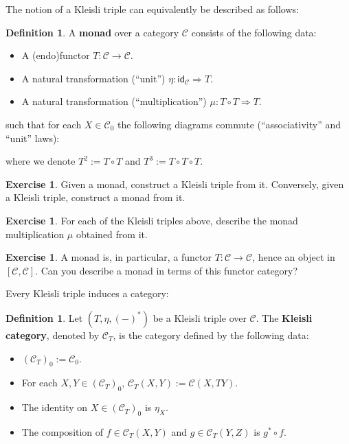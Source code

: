 \documentclass[a4paper,11pt, oneside,titlepage=false]{scrbook}
\theoremstyle{plain}
\theoremstyle{definition}
\newtheorem{dfn}[thm]{Definition}
\newtheorem{exer}[thm]{Exercise}
\newcommand{\cfont}[1]{\ensuremath{\mathsf{#1}}}
\newcommand{\Cat}[1]{\mathcal{#1}}
\newcommand{\CC}{\Cat{C}}
\newcommand{\Ob}[1]{{#1}_0}
\newcommand{\CHom}[3]{{#1}(#2,#3)}
\newcommand{\Id}[1][]{\cfont{id}_{#1}}
\newcommand{\NatTrans}[3]{#1 : #2 \Rightarrow #3}
\newcommand{\co}[2]{\ensuremath{#2 \circ #1}}
\begin{document}
The notion of a Kleisli triple can equivalently be described  as follows:
\begin{dfn}\label{def:monad}
A \textbf{monad} over a category $\CC$ consists of the following data:
\begin{itemize}
\item A (endo)functor $T:\CC\to\CC$.
\item A natural transformation (``unit'') $\NatTrans{\eta}{\Id[\CC]}{T}$.
\item A natural transformation (``multiplication'') $\NatTrans{\mu}{\co{T}{T}}{T}$.
\end{itemize}
such that for each $X\in\Ob{\CC}$ the following diagrams commute (``associativity'' and ``unit'' laws):
\begin{center}
\quad
{}

\end{center}
where we denote $T^2 := \co{T}{T}$ and $T^3 := \co{T}{\co{T}{T}}$.
\end{dfn}

\begin{exer} Given a monad, construct a Kleisli triple from it.
Conversely, given a Kleisli triple, construct a monad from it.
\end{exer}

\begin{exer}
  For each of the Kleisli triples above, describe the monad multiplication $\mu$ obtained from it.
\end{exer}

\begin{exer}
A monad is, in particular, a functor $T : \CC \to \CC$, hence an object in $[\CC,\CC]$.
Can you describe a monad in terms of this functor category?
\end{exer}

Every Kleisli triple induces a category:
\begin{dfn} Let $(T,\eta, (-)^{*})$ be a Kleisli triple over $\CC$. The \textbf{Kleisli category}, denoted by $\CC_{T}$, is the category defined by the following data:
\begin{itemize}
\item $\Ob{(\CC_T)} := \Ob{\CC}$.
\item For each $X,Y\in\Ob{(\CC_T)}$, $\CHom{\CC_T}{X}{Y} := \CHom{\CC}{X}{TY}$.
\item The identity on $X\in\Ob{(\CC_T)}$ is $\eta_X$.
\item The composition of $f\in \CHom{\CC_T}{X}{Y}$ and $g\in \CHom{\CC_T}{Y}{Z}$ is $\co{f}{g^{*}}$.
\end{itemize}
\end{dfn}
\end{document}
